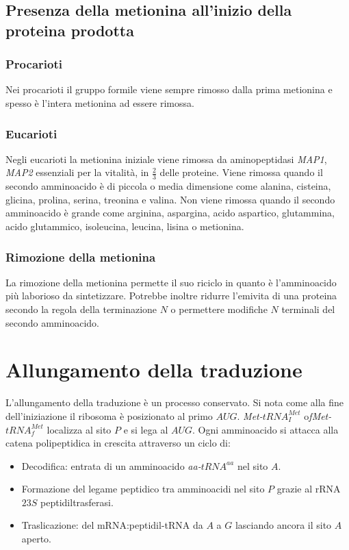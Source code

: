 \subsection{Presenza della metionina all'inizio della proteina prodotta}
\subsubsection{Procarioti}
Nei procarioti il gruppo formile viene sempre rimosso dalla prima metionina e spesso \`e l'intera metionina ad essere rimossa.
\subsubsection{Eucarioti}
Negli eucarioti la metionina iniziale viene rimossa da aminopeptidasi \emph{MAP1}, \emph{MAP2} essenziali per la vitalit\`a, in $\frac{2}{3}$ delle proteine. Viene rimossa quando il secondo amminoacido
\`e di piccola o media dimensione come alanina, cisteina, glicina, prolina, serina, treonina e valina. Non viene rimossa quando il secondo amminoacido \`e grande come arginina, aspargina, acido 
aspartico, glutammina, acido glutammico, isoleucina, leucina, lisina o metionina.
\subsubsection{Rimozione della metionina}
La rimozione della metionina permette il suo riciclo in quanto \`e l'amminoacido pi\`u laborioso da sintetizzare. Potrebbe inoltre ridurre l'emivita di una proteina secondo la regola della terminazione
$N$ o permettere modifiche $N$ terminali del secondo amminoacido. 
\section{Allungamento della traduzione}
L'allungamento della traduzione \`e un processo conservato. Si nota come alla fine dell'iniziazione il ribosoma \`e posizionato al primo $AUG$. \emph{Met-$tRNA_I^{Met}$} o\emph{fMet-$tRNA_f^{Met}$} 
localizza al sito $P$ e si lega al $AUG$. Ogni amminoacido si attacca alla catena polipeptidica in crescita attraverso un ciclo di:
\begin{itemize}
	\item Decodifica: entrata di un amminoacido \emph{aa-$tRNA^{aa}$} nel sito $A$.
	\item Formazione del legame peptidico tra amminoacidi nel sito $P$ grazie al rRNA $23S$ peptidiltrasferasi.
	\item Traslicazione: del mRNA:peptidil-tRNA da $A$ a $G$ lasciando ancora il sito $A$ aperto.
\end{itemize}
